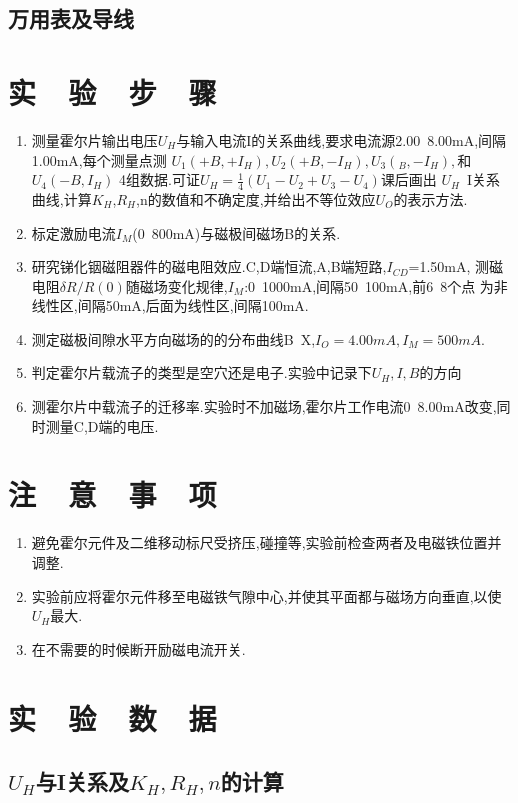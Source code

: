 \documentclass{thuemp}
\begin{document}
\subsection{万用表及导线}
\section{实~~验~~步~~骤} 
\begin{enumerate}
	\item 测量霍尔片输出电压$U_{H}$与输入电流I的关系曲线,要求电流源2.00~8.00mA,间隔1.00mA,每个测量点测
	$ U_{1}(+B,+I_H{}),U_{2}(+B,-I_{H}),U_{3}(_B,-I_{H}), $和$U_{4}(-B,I_{H})$
	4组数据.可证$U_{H}=\frac{1}{4}(U_{1}-U_{2}+U_{3}-U_{4})$课后画出
	$U_{H}$~I关系曲线,计算$K_{H}$,$R_{H}$,n的数值和不确定度,并给出不等位效应$U_{O}$的表示方法.
	\item 标定激励电流$I_{M}$(0~800mA)与磁极间磁场B的关系.
	\item 研究锑化铟磁阻器件的磁电阻效应.C,D端恒流,A,B端短路,$ I_{CD} $=1.50mA,
	测磁电阻$ \delta R/R(0) $随磁场变化规律,$ I_{M} $:0~1000mA,间隔50~100mA,前6~8个点
	为非线性区,间隔50mA,后面为线性区,间隔100mA.
	\item 测定磁极间隙水平方向磁场的的分布曲线B~X,$ I_{O}=4.00mA,I_{M}=500mA $.
	\item 判定霍尔片载流子的类型是空穴还是电子.实验中记录下$ U_{H},I,B $的方向
	\item 测霍尔片中载流子的迁移率.实验时不加磁场,霍尔片工作电流0~8.00mA改变,同时测量C,D端的电压.
\end{enumerate}
\section{注~~意~~事~~项}
\begin{enumerate} 
	\item 避免霍尔元件及二维移动标尺受挤压,碰撞等,实验前检查两者及电磁铁位置并调整.
	\item 实验前应将霍尔元件移至电磁铁气隙中心,并使其平面都与磁场方向垂直,以使$U_{H}$最大.
	\item 在不需要的时候断开励磁电流开关.
\end{enumerate}
\section{实~~验~~数~~据}

\subsection{$U_{H}$与I关系及$K_{H},R_{H},n$的计算}
\end{document}
